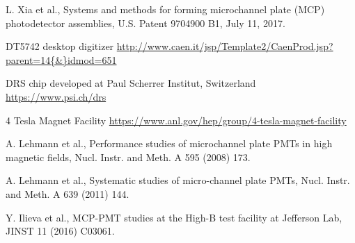 \documentclass[preprint,5p]{elsarticle}
\begin{document}
\begin{thebibliography}{99}
L. Xia et al., Systems and methods for forming microchannel plate (MCP) 
photodetector assemblies, U.S. Patent 9704900 B1, July 11, 2017.

DT5742 desktop digitizer 
\url{http://www.caen.it/jsp/Template2/CaenProd.jsp?parent=14{\&}idmod=651}

   DRS chip developed at Paul Scherrer Institut, Switzerland \url{
https://www.psi.ch/drs}

4 Tesla Magnet Facility 
\url{https://www.anl.gov/hep/group/4-tesla-magnet-facility}

A. Lehmann et al., Performance studies of microchannel plate PMTs in high 
magnetic fields, Nucl. Instr. and Meth. A 595 (2008) 173.

A. Lehmann et al., Systematic studies of micro-channel plate PMTs, Nucl.  
Instr. and Meth. A 639 (2011) 144.

Y. Ilieva et al., MCP-PMT studies at the High-B test facility at Jefferson Lab, 
JINST 11 (2016) C03061.

\end{thebibliography}
\end{document}
